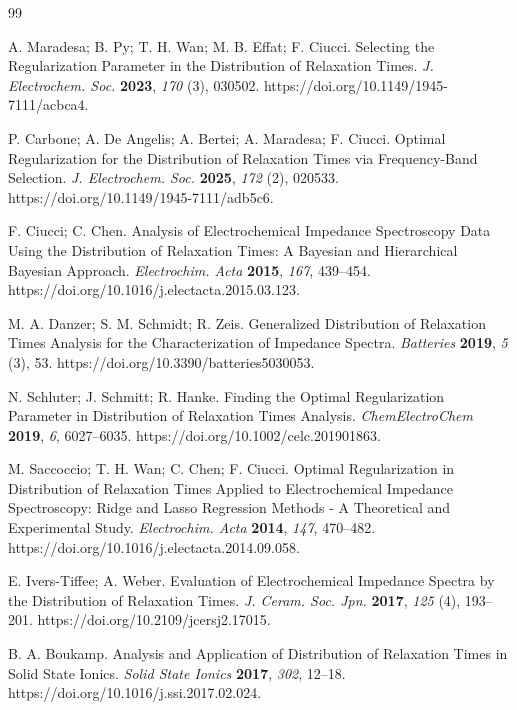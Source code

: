 \documentclass[11pt]{article}
\begin{document}
\begin{thebibliography}{99}

A. Maradesa; B. Py; T. H. Wan; M. B. Effat; F. Ciucci. Selecting the Regularization Parameter in the Distribution of Relaxation Times. \textit{J. Electrochem. Soc.} \textbf{2023}, \textit{170} (3), 030502. https://doi.org/10.1149/1945-7111/acbca4.

P. Carbone; A. De Angelis; A. Bertei; A. Maradesa; F. Ciucci. Optimal Regularization for the Distribution of Relaxation Times via Frequency-Band Selection. \textit{J. Electrochem. Soc.} \textbf{2025}, \textit{172} (2), 020533. https://doi.org/10.1149/1945-7111/adb5c6.

F. Ciucci; C. Chen. Analysis of Electrochemical Impedance Spectroscopy Data Using the Distribution of Relaxation Times: A Bayesian and Hierarchical Bayesian Approach. \textit{Electrochim. Acta} \textbf{2015}, \textit{167}, 439--454. https://doi.org/10.1016/j.electacta.2015.03.123.

M. A. Danzer; S. M. Schmidt; R. Zeis. Generalized Distribution of Relaxation Times Analysis for the Characterization of Impedance Spectra. \textit{Batteries} \textbf{2019}, \textit{5} (3), 53. https://doi.org/10.3390/batteries5030053.

N. Schluter; J. Schmitt; R. Hanke. Finding the Optimal Regularization Parameter in Distribution of Relaxation Times Analysis. \textit{ChemElectroChem} \textbf{2019}, \textit{6}, 6027--6035. https://doi.org/10.1002/celc.201901863.

M. Saccoccio; T. H. Wan; C. Chen; F. Ciucci. Optimal Regularization in Distribution of Relaxation Times Applied to Electrochemical Impedance Spectroscopy: Ridge and Lasso Regression Methods - A Theoretical and Experimental Study. \textit{Electrochim. Acta} \textbf{2014}, \textit{147}, 470--482. https://doi.org/10.1016/j.electacta.2014.09.058.

E. Ivers-Tiffee; A. Weber. Evaluation of Electrochemical Impedance Spectra by the Distribution of Relaxation Times. \textit{J. Ceram. Soc. Jpn.} \textbf{2017}, \textit{125} (4), 193--201. https://doi.org/10.2109/jcersj2.17015.

B. A. Boukamp. Analysis and Application of Distribution of Relaxation Times in Solid State Ionics. \textit{Solid State Ionics} \textbf{2017}, \textit{302}, 12--18. https://doi.org/10.1016/j.ssi.2017.02.024.


\end{thebibliography}
\end{document}
